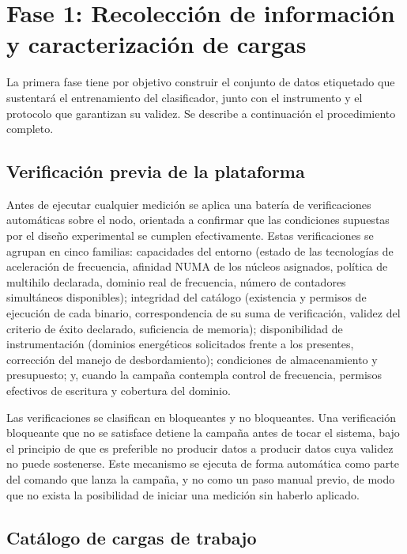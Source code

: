\documentclass[12pt,oneside,spanish]{book}
\begin{document}
\section{Fase 1: Recolección de información y caracterización de cargas}

La primera fase tiene por objetivo construir el conjunto de datos etiquetado que sustentará el entrenamiento del clasificador, junto con el instrumento y el protocolo que garantizan su validez. Se describe a continuación el procedimiento completo.

\subsection{Verificación previa de la plataforma}
\label{sec:verificacion-previa}

Antes de ejecutar cualquier medición se aplica una batería de verificaciones automáticas sobre el nodo, orientada a confirmar que las condiciones supuestas por el diseño experimental se cumplen efectivamente. Estas verificaciones se agrupan en cinco familias: capacidades del entorno (estado de las tecnologías de aceleración de frecuencia, afinidad NUMA de los núcleos asignados, política de multihilo declarada, dominio real de frecuencia, número de contadores simultáneos disponibles); integridad del catálogo (existencia y permisos de ejecución de cada binario, correspondencia de su suma de verificación, validez del criterio de éxito declarado, suficiencia de memoria); disponibilidad de instrumentación (dominios energéticos solicitados frente a los presentes, corrección del manejo de desbordamiento); condiciones de almacenamiento y presupuesto; y, cuando la campaña contempla control de frecuencia, permisos efectivos de escritura y cobertura del dominio.

Las verificaciones se clasifican en bloqueantes y no bloqueantes. Una verificación bloqueante que no se satisface detiene la campaña antes de tocar el sistema, bajo el principio de que es preferible no producir datos a producir datos cuya validez no puede sostenerse. Este mecanismo se ejecuta de forma automática como parte del comando que lanza la campaña, y no como un paso manual previo, de modo que no exista la posibilidad de iniciar una medición sin haberlo aplicado.

\subsection{Catálogo de cargas de trabajo}
\end{document}
